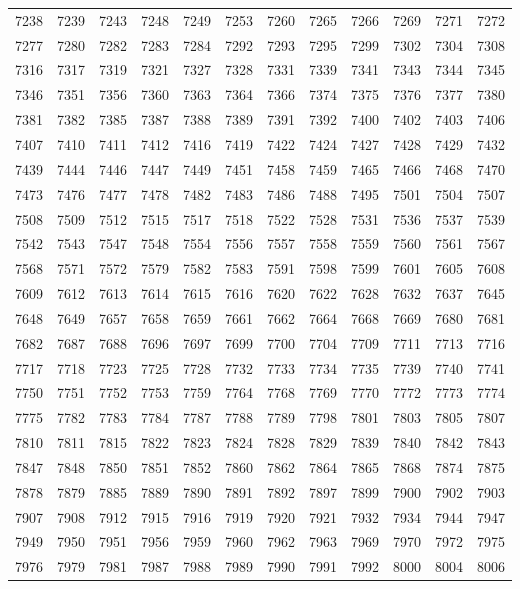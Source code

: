 \begin{center}
\begin{longtable}{llllllllllll}
7238 &7239 &7243 &7248 &7249 &7253 &7260 &7265 &7266 &7269 &7271 &7272 \\
7277 &7280 &7282 &7283 &7284 &7292 &7293 &7295 &7299 &7302 &7304 &7308 \\
7316 &7317 &7319 &7321 &7327 &7328 &7331 &7339 &7341 &7343 &7344 &7345 \\
7346 &7351 &7356 &7360 &7363 &7364 &7366 &7374 &7375 &7376 &7377 &7380 \\
7381 &7382 &7385 &7387 &7388 &7389 &7391 &7392 &7400 &7402 &7403 &7406 \\
7407 &7410 &7411 &7412 &7416 &7419 &7422 &7424 &7427 &7428 &7429 &7432 \\
7439 &7444 &7446 &7447 &7449 &7451 &7458 &7459 &7465 &7466 &7468 &7470 \\
7473 &7476 &7477 &7478 &7482 &7483 &7486 &7488 &7495 &7501 &7504 &7507 \\
7508 &7509 &7512 &7515 &7517 &7518 &7522 &7528 &7531 &7536 &7537 &7539 \\
7542 &7543 &7547 &7548 &7554 &7556 &7557 &7558 &7559 &7560 &7561 &7567 \\
7568 &7571 &7572 &7579 &7582 &7583 &7591 &7598 &7599 &7601 &7605 &7608 \\
7609 &7612 &7613 &7614 &7615 &7616 &7620 &7622 &7628 &7632 &7637 &7645 \\
7648 &7649 &7657 &7658 &7659 &7661 &7662 &7664 &7668 &7669 &7680 &7681 \\
7682 &7687 &7688 &7696 &7697 &7699 &7700 &7704 &7709 &7711 &7713 &7716 \\
7717 &7718 &7723 &7725 &7728 &7732 &7733 &7734 &7735 &7739 &7740 &7741 \\
7750 &7751 &7752 &7753 &7759 &7764 &7768 &7769 &7770 &7772 &7773 &7774 \\
7775 &7782 &7783 &7784 &7787 &7788 &7789 &7798 &7801 &7803 &7805 &7807 \\
7810 &7811 &7815 &7822 &7823 &7824 &7828 &7829 &7839 &7840 &7842 &7843 \\
7847 &7848 &7850 &7851 &7852 &7860 &7862 &7864 &7865 &7868 &7874 &7875 \\
7878 &7879 &7885 &7889 &7890 &7891 &7892 &7897 &7899 &7900 &7902 &7903 \\
7907 &7908 &7912 &7915 &7916 &7919 &7920 &7921 &7932 &7934 &7944 &7947 \\
7949 &7950 &7951 &7956 &7959 &7960 &7962 &7963 &7969 &7970 &7972 &7975 \\
7976 &7979 &7981 &7987 &7988 &7989 &7990 &7991 &7992 &8000 &8004 &8006 \\

\end{longtable}
\end{center}
